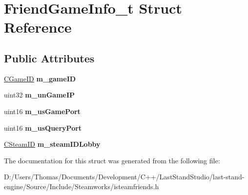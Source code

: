 \hypertarget{structFriendGameInfo__t}{}\section{Friend\+Game\+Info\+\_\+t Struct Reference}
\label{structFriendGameInfo__t}
\subsection*{Public Attributes}
\begin{DoxyCompactItemize}
\item 
\hypertarget{structFriendGameInfo__t_aa5481ff8a25f28f289cc801c9ace4849}{}\hyperlink{classCGameID}{C\+Game\+I\+D} {\bfseries m\+\_\+game\+I\+D}\label{structFriendGameInfo__t_aa5481ff8a25f28f289cc801c9ace4849}

\item 
\hypertarget{structFriendGameInfo__t_ace9620f5cd47c58d573540000b7c0112}{}uint32 {\bfseries m\+\_\+un\+Game\+I\+P}\label{structFriendGameInfo__t_ace9620f5cd47c58d573540000b7c0112}

\item 
\hypertarget{structFriendGameInfo__t_a874f6296ec36db3e4307aa3c94d2b4cc}{}uint16 {\bfseries m\+\_\+us\+Game\+Port}\label{structFriendGameInfo__t_a874f6296ec36db3e4307aa3c94d2b4cc}

\item 
\hypertarget{structFriendGameInfo__t_a02ea82c47b8ef3083d98aa382864ec3d}{}uint16 {\bfseries m\+\_\+us\+Query\+Port}\label{structFriendGameInfo__t_a02ea82c47b8ef3083d98aa382864ec3d}

\item 
\hypertarget{structFriendGameInfo__t_a436683ac4e23a83bdb9f6af834589a4a}{}\hyperlink{classCSteamID}{C\+Steam\+I\+D} {\bfseries m\+\_\+steam\+I\+D\+Lobby}\label{structFriendGameInfo__t_a436683ac4e23a83bdb9f6af834589a4a}

\end{DoxyCompactItemize}


The documentation for this struct was generated from the following file\+:\begin{DoxyCompactItemize}
\item 
D\+:/\+Users/\+Thomas/\+Documents/\+Development/\+C++/\+Last\+Stand\+Studio/last-\/stand-\/engine/\+Source/\+Include/\+Steamworks/isteamfriends.\+h\end{DoxyCompactItemize}
